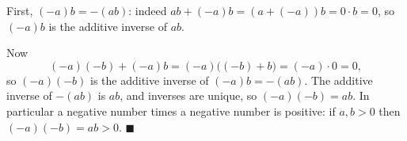 First, $(-a)b=-(ab)$: indeed $ab+(-a)b=(a+(-a))b=0\cdot b=0$, so $(-a)b$ is the additive inverse of $ab$.

Now
\[
(-a)(-b)+(-a)b=(-a)\bigl((-b)+b\bigr)=(-a)\cdot0=0,
\]
so $(-a)(-b)$ is the additive inverse of $(-a)b=-(ab)$. The additive inverse of $-(ab)$ is $ab$, and inverses are unique, so $(-a)(-b)=ab$. In particular a negative number times a negative number is positive: if $a,b>0$ then $(-a)(-b)=ab>0$. $\blacksquare$
